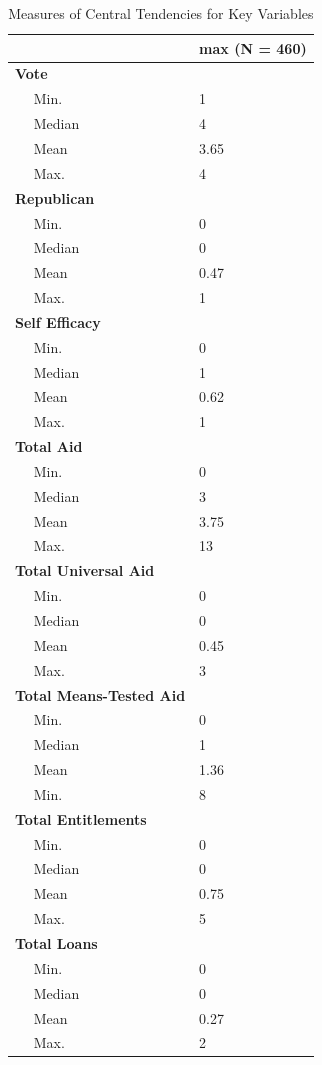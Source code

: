 \documentclass[12pt]{paper}
\begin{document}
\begin{table}
\begin{tabular}{l|l}
	\hline
	& max (N = 460)\\
	\hline
	\bf{Vote} & ~\\
	\hline
	~~ Min. & 1\\
	\hline
	~~ Median & 4\\
	\hline
	~~ Mean & 3.65\\
	\hline
	~~ Max. & 4\\
	\hline
	\bf{Republican} & ~\\
	\hline
	~~ Min. & 0\\
	\hline
	~~ Median & 0\\
	\hline
	~~ Mean & 0.47\\
	\hline
	~~ Max. & 1\\
	\hline
	\bf{Self Efficacy} & ~\\
	\hline
	~~ Min. & 0\\
	\hline
	~~ Median & 1\\
	\hline
	~~ Mean & 0.62\\
	\hline
	~~ Max. & 1\\
	\hline
	\bf{Total Aid} & ~\\
	\hline
	~~ Min. & 0\\
	\hline
	~~ Median & 3\\
	\hline
	~~ Mean & 3.75\\
	\hline
	~~ Max. & 13\\
	\hline
	\bf{Total Universal Aid} & ~\\
	\hline
	~~ Min. & 0\\
	\hline
	~~ Median & 0\\
	\hline
	~~ Mean & 0.45\\
	\hline
	~~ Max. & 3\\
	\hline
	\bf{Total Means-Tested Aid} & ~\\
	\hline
	~~ Min. & 0\\
	\hline
	~~ Median & 1\\
	\hline
	~~ Mean & 1.36\\
	\hline
	~~ Min. & 8\\
	\hline
	\bf{Total Entitlements} & ~\\
	\hline
	~~ Min. & 0\\
	\hline
	~~ Median & 0\\
	\hline
	~~ Mean & 0.75\\
	\hline
	~~ Max. & 5\\
	\hline
	\bf{Total Loans} & ~\\
	\hline
	~~ Min. & 0\\
	\hline
	~~ Median & 0\\
	\hline
	~~ Mean & 0.27\\
	\hline
	~~ Max. & 2\\
	\hline
\end{tabular}
\caption{Measures of Central Tendencies for Key Variables}
\label{Appendix C.1}
\end{table}
\end{document}

